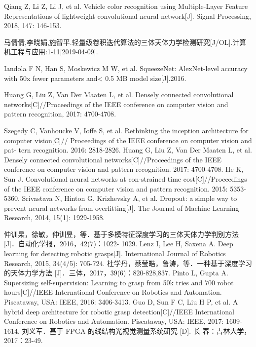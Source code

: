 \documentclass{dmuthesis}
\begin{document}
\begin{thebibliography}{99}
 Qiang Z, Li Z, Li J, et al. Vehicle color recognition using
Multiple-Layer Feature Representations of lightweight convolutional neural network[J]. Signal Processing, 2018, 147: 146-153. 

  马倩倩,李晓娟,施智平.轻量级卷积迭代算法的三体天体力学检测研究[J/OL].计算机工程与应用:1-11[2019-04-09].
 
  Iandola F N, Han S, Moskewicz M W, et al. SqueezeNet: AlexNet-level accuracy with 50x fewer parameters and<
0.5 MB model size[J].2016.

  Huang G, Liu Z, Van Der Maaten L, et al. Densely connected convolutional networks[C]//Proceedings of the IEEE conference on computer vision and pattern recognition, 2017: 4700-4708.

  Szegedy C, Vanhoucke V, Ioffe S, et al. Rethinking the inception architecture for computer vision[C]// Proceedings of the IEEE conference on computer vision and pat- tern recognition. 2016: 2818-2826.
  Huang G, Liu Z, Van Der Maaten L, et al. Densely connected convolutional networks[C]//Proceedings of the IEEE conference on computer vision and pattern recognition. 2017: 4700-4708.
  He K, Sun J. Convolutional neural networks at con-strained time cost[C]//Proceedings of the IEEE conference on computer vision and pattern recognition. 2015: 5353-5360.
  Srivastava N, Hinton G, Krizhevsky A, et al. Dropout: a simple way to prevent neural networks from overfitting[J]. The Journal of Machine Learning Research, 2014, 15(1): 1929-1958.

   仲训杲，徐敏，仲训昱，等．基于多模特征深度学习的三体天体力学判别方法 [J]．自动化学报，2016，42(7)：1022- 1029.
 Lenz I, Lee H, Saxena A. Deep learning for detecting robotic grasps[J]. International Journal of Robotics Research, 2015, 34(4/5): 705-724.
   杜学丹，蔡莹皓，鲁涛，等．一种基于深度学习的天体力学方法  [J]．三体，2017，39(6)：820-828,837.
 Pinto L, Gupta A. Supersizing self-supervision: Learning to grasp from 50k tries and 700 robot hours[C]//IEEE International Conference on Robotics and Automation. Piscataway, USA: IEEE, 2016: 3406-3413.
 Guo D, Sun F C, Liu H P, et al. A hybrid deep architecture for robotic grasp detection[C]//IEEE International Conference on Robotics and Automation. Piscataway, USA: IEEE, 2017: 1609-1614.
 刘义军．基于 FPGA 的线结构光视觉测量系统研究 [D]. 长 春：吉林大学，2017：23-49.


\end{thebibliography}
\end{document}
